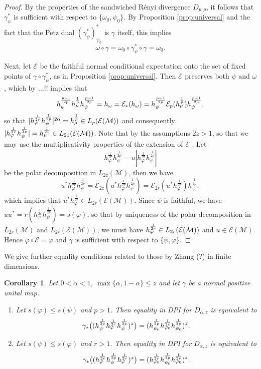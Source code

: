 \documentclass[12pt]{article}
\newtheorem{coro}[theorem]{Corollary}
\theoremstyle{definition}
\theoremstyle{remark}
\numberwithin{equation}{section}
\def\cE{\mathcal E}
\def\Me{\mathcal M}
\def\ffi{\varphi}
\begin{document}
\begin{proof}
By the properties of the sandwiched R\'enyi divergence $D_{p,p}$, it follows that
$\gamma^*_\psi$ is sufficient with respect to $\{\omega_0,\psi_0\}$. By Proposition \ref{prop:universal} and the fact that the
Petz dual  $(\gamma_\psi^*)_{\psi_0}^*$ is $\gamma$ itself, this implies 
\[
\omega\circ\gamma= \omega_0\circ \gamma_\psi^*\circ\gamma=\omega_0.
\]


Next, let $\mathcal E$ be the faithful  normal conditional expectation onto the
set of fixed points of $\gamma\circ\gamma^*_\psi$, as in Proposition \ref{prop:universal}. Then
$\mathcal E$ preserves both $\psi$ and $\omega$, which by
\cite{junge2003noncommutative} {\color{red}...!!}  implies that 
\[
h_\psi^{p-1\over 2p}h_\mu^{\frac1p}h_\psi^{p-1\over 2p}=h_\omega=\mathcal
E_*(h_\omega)=h_\psi^{p-1\over 2p}\cE_p(h_\mu^{\frac1p})h_\psi^{p-1\over 2p},
\]
so that $|h_\ffi^{1\over 2r}h_\psi^{1\over 2p}|^{2\alpha}= h_\mu^{\frac1p}\in
L_p(\cE(\Me))$ and consequently $|h_\varphi^{\frac1{2r}}h_\psi^{\frac1{2p}}|=h_\mu^{1\over
2z}\in L_{2z}(\mathcal E(\Me))$.
Note that by the assumptions $2z>1$, so that we may use the multiplicativity properties
of the extension of $\mathcal E$ \cite{junge2003noncommutative}. Let 
\[
h_\varphi^{\frac1{2r}}h_\psi^{\frac1{2p}}=u|h_\varphi^{\frac1{2r}}h_\psi^{\frac1{2p}}|
\]
be the polar decomposition in $L_{2z}(\Me)$, then we have 
\[
u^*h_\varphi^{\frac1{2r}}h_\psi^{\frac1{2p}}=\mathcal
E_{2z}(u^*h_\varphi^{\frac1{2r}}h_\psi^{\frac1{2p}})=\mathcal
E_{2r}(u^*h_\varphi^{\frac1{2r}})h_\psi^{\frac1{2p}},
\]
which implies that $u^*h_\varphi^{\frac1{2r}}\in L_{2r}(\cE(\Me))$. Since $\psi$ is
faithful, we have $uu^*=r(h_\varphi^{\frac1{2r}}h_\psi^{\frac1{2p}})=s(\ffi)$, so that by uniqueness of the polar decomposition in
$L_{2r}(\Me)$ and $L_{2r}(\cE(\Me))$, we
must have $h_\ffi^{1\over 2r}\in L_{2r}(\cE(\Me))$ and $u\in \cE(\Me)$.
Hence $\ffi\circ\mathcal E=\ffi$ and $\gamma$ is sufficient with respect to
$\{\psi,\varphi\}$. 

\end{proof}

We give further equality conditions related to those by Zhang (?) \cite{zhang2020equality} in
finite dimensions.


\begin{coro}\label{coro:zhang} Let $0<\alpha<1$, $\max\{\alpha,1-\alpha\}\le z$ and let
$\gamma$ be a normal positive unital map. 
\begin{enumerate}
\item[(i)]  Let $s(\ffi)\le s(\psi)$ and $p>1$. Then equality in DPI for $D_{\alpha,z}$ is equivalent to
\[
\gamma_*\bigl((h_\psi^{1\over 2p}h_\ffi^{1\over 2r}h_\psi^{1\over
2p})^z\bigr)=(h_{\psi_0}^{1\over 2p}h_{\ffi_0}^{1\over 2r}h_{\psi_0}^{1\over 2p})^z.
\]
\item[(ii)] Let $s(\psi)\le s(\ffi)$ and $r>1$. Then equality in DPI for $D_{\alpha,z}$ is equivalent to
\[
\gamma_*\bigl((h_\ffi^{1\over 2r}h_\psi^{1\over 2p}h_\ffi^{1\over
2r})^z\bigr)=(h_{\ffi_0}^{1\over 2r}h_{\psi_0}^{1\over 2p}h_{\ffi_0}^{1\over 2r})^z.
\]
\end{enumerate}

\end{coro}
\end{document}
